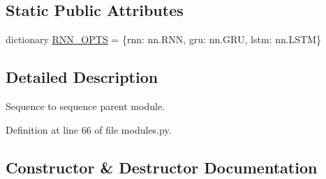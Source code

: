 \subsection*{Static Public Attributes}
\begin{DoxyCompactItemize}
\item 
dictionary \hyperlink{classcontrollable__seq2seq_1_1modules_1_1Seq2seq_ac0f54e9ab06d61927ad37cf4617f5485}{R\+N\+N\+\_\+\+O\+P\+TS} = \{\textquotesingle{}rnn\textquotesingle{}\+: nn.\+R\+NN, \textquotesingle{}gru\textquotesingle{}\+: nn.\+G\+RU, \textquotesingle{}lstm\textquotesingle{}\+: nn.\+L\+S\+TM\}
\end{DoxyCompactItemize}


\subsection{Detailed Description}
\begin{DoxyVerb}Sequence to sequence parent module.\end{DoxyVerb}
 

Definition at line 66 of file modules.\+py.



\subsection{Constructor \& Destructor Documentation}
\mbox{\label{classcontrollable__seq2seq_1_1modules_1_1Seq2seq_a7e0be48d22af98a3102a3aba537f8c7d}} 

